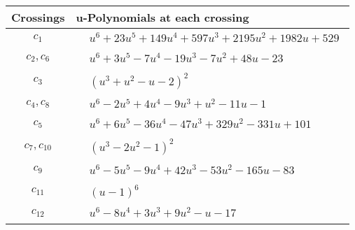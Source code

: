 \documentclass[1p]{elsarticle_modified}
\theoremstyle{definition}
\begin{document}
\begin{tabular}{m{50pt}|m{274pt}}
Crossings & \hspace{64pt}u-Polynomials at each crossing \\
\hline $$\begin{aligned}c_{1}\end{aligned}$$&$\begin{aligned}
&u^6+23 u^5+149 u^4+597 u^3+2195 u^2+1982 u+529
\end{aligned}$\\
\hline $$\begin{aligned}c_{2},c_{6}\end{aligned}$$&$\begin{aligned}
&u^6+3 u^5-7 u^4-19 u^3-7 u^2+48 u-23
\end{aligned}$\\
\hline $$\begin{aligned}c_{3}\end{aligned}$$&$\begin{aligned}
&(u^3+u^2- u-2)^2
\end{aligned}$\\
\hline $$\begin{aligned}c_{4},c_{8}\end{aligned}$$&$\begin{aligned}
&u^6-2 u^5+4 u^4-9 u^3+u^2-11 u-1
\end{aligned}$\\
\hline $$\begin{aligned}c_{5}\end{aligned}$$&$\begin{aligned}
&u^6+6 u^5-36 u^4-47 u^3+329 u^2-331 u+101
\end{aligned}$\\
\hline $$\begin{aligned}c_{7},c_{10}\end{aligned}$$&$\begin{aligned}
&(u^3-2 u^2-1)^2
\end{aligned}$\\
\hline $$\begin{aligned}c_{9}\end{aligned}$$&$\begin{aligned}
&u^6-5 u^5-9 u^4+42 u^3-53 u^2-165 u-83
\end{aligned}$\\
\hline $$\begin{aligned}c_{11}\end{aligned}$$&$\begin{aligned}
&(u-1)^6
\end{aligned}$\\
\hline $$\begin{aligned}c_{12}\end{aligned}$$&$\begin{aligned}
&u^6-8 u^4+3 u^3+9 u^2- u-17
\end{aligned}$\\
\hline
\end{tabular}\\~\\
\end{document}
